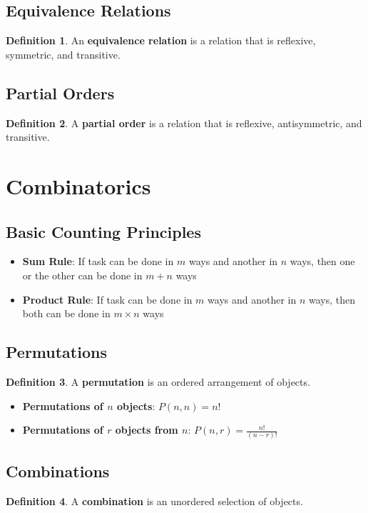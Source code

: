 \documentclass[11pt]{article}
\theoremstyle{definition}
\newtheorem{definition}{Definition}[section]
\begin{document}
\subsection{Equivalence Relations}
\begin{definition}
An \textbf{equivalence relation} is a relation that is reflexive, symmetric, and transitive.
\end{definition}

\subsection{Partial Orders}
\begin{definition}
A \textbf{partial order} is a relation that is reflexive, antisymmetric, and transitive.
\end{definition}

\section{Combinatorics}

\subsection{Basic Counting Principles}
\begin{itemize}
    \item \textbf{Sum Rule}: If task can be done in $m$ ways and another in $n$ ways, then one or the other can be done in $m + n$ ways
    \item \textbf{Product Rule}: If task can be done in $m$ ways and another in $n$ ways, then both can be done in $m \times n$ ways
\end{itemize}

\subsection{Permutations}
\begin{definition}
A \textbf{permutation} is an ordered arrangement of objects.
\end{definition}

\begin{itemize}
    \item \textbf{Permutations of $n$ objects}: $P(n,n) = n!$
    \item \textbf{Permutations of $r$ objects from $n$}: $P(n,r) = \frac{n!}{(n-r)!}$
\end{itemize}

\subsection{Combinations}
\begin{definition}
A \textbf{combination} is an unordered selection of objects.
\end{definition}
\end{document}
